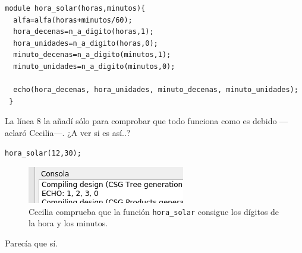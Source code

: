 \begin{lstlisting}
module hora_solar(horas,minutos){
  alfa=alfa(horas+minutos/60);
  hora_decenas=n_a_digito(horas,1);
  hora_unidades=n_a_digito(horas,0);
  minuto_decenas=n_a_digito(minutos,1);
  minuto_unidades=n_a_digito(minutos,0);

  echo(hora_decenas, hora_unidades, minuto_decenas, minuto_unidades);
 }
\end{lstlisting}

\guillemotright La línea 8 la añadí sólo para comprobar que todo
funciona como es debido ---aclaró Cecilia---. ¿A ver si es así..?

\begin{lstlisting}[numbers=none]
hora_solar(12,30);
\end{lstlisting}

\begin{figure}[ht]
  \centering
  \includegraphics[width=.6\textwidth]{imagenes/hora-prueba-1}
  \caption[Dígitos de la hora.]{Cecilia comprueba que la función
    \lstinline!hora_solar! consigue los dígitos de la hora y los
    minutos.}
  \label{fig:hora-prueba-1}
\end{figure}
  

Parecía que sí.



